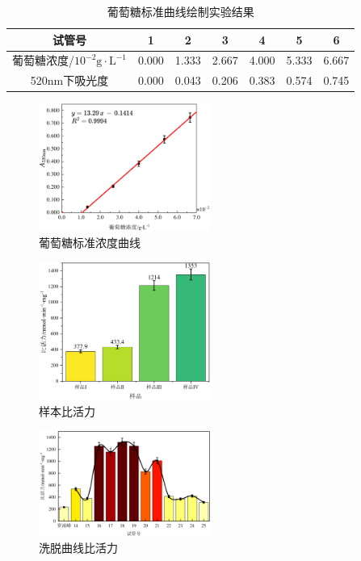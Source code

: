 \begin{table}[H]
\centering
\caption{葡萄糖标准曲线绘制实验结果}
\label{tab:result_GLUCOSE_STD}
\begin{tabular}{@{}ccccccc@{}}
\toprule
试管号       & 1     & 2     & 3     & 4     & 5     & 6     \\ \midrule
葡萄糖浓度/$10^{-2}\mathrm{g \cdot L^{-1}}$    & 0.000 & 1.333 & 2.667 & 4.000 & 5.333 & 6.667 \\
520nm下吸光度 & 0.000 & 0.043 & 0.206 & 0.383 & 0.574 & 0.745 \\ \bottomrule
\end{tabular}
\end{table}

\begin{figure}[H]
    \centering
    \includegraphics[width = 0.5\textwidth]{figure/1124/Glucose_STD.pdf}
    \caption{葡萄糖标准浓度曲线}
    \label{fig:STD_Glucose}
\end{figure}

\begin{figure}[H]
    \centering
    \includegraphics[width = 0.5\textwidth]{figure/1124/Activity_Sample.pdf}
    \caption{样本比活力}
    \label{fig:Activity_Sample}
\end{figure}

\begin{figure}[H]
    \centering
    \includegraphics[width = 0.5\textwidth]{figure/1124/Activity_Curve.pdf}
    \caption{洗脱曲线比活力}
    \label{fig:Activity_Curve}
\end{figure}

